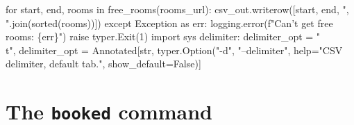     for start, end, rooms in free_rooms(rooms_url):
      csv_out.writerow([start, end, ", ".join(sorted(rooms))])
  except Exception as err:
    logging.error(f"Can't get free rooms: \{err\}")
    raise typer.Exit(1)
\nwendcode{}\plusendmoddef\nwstartdeflinemarkup{}\nwenddeflinemarkup
import sys
\nwendcode{}\endmoddef\nwstartdeflinemarkup{}\nwenddeflinemarkup
delimiter: delimiter_opt = "\\t",
\nwendcode{}\endmoddef\nwstartdeflinemarkup{}\nwenddeflinemarkup
delimiter_opt = Annotated[str,
                          typer.Option("-d", "--delimiter",
                          help="CSV delimiter, default tab.",
                          show_default=False)]
\nwendcode{}\nwdocspar


\section{The \texttt{booked} command}

